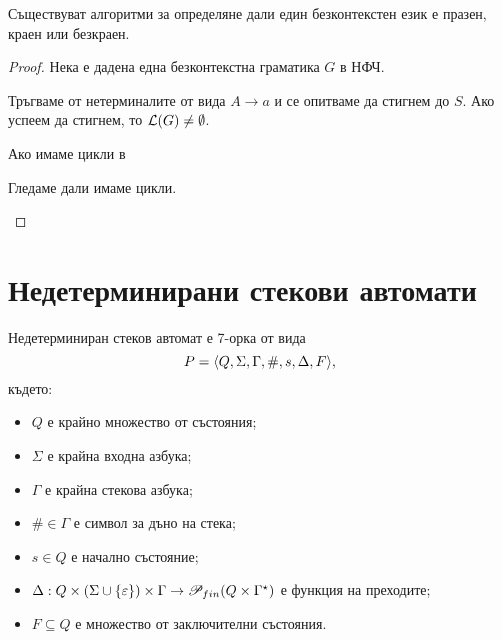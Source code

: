 \begin{thm}
  Съществуват алгоритми за определяне дали един безконтекстен език е 
  празен, краен или безкраен.
\end{thm}
\begin{proof}
  Нека е дадена една безконтекстна граматика $G$ в НФЧ.
  \begin{description}
  \item[($\L(G) = \emptyset?$)]
    Тръгваме от нетерминалите от вида $A\to a$ и се опитваме да стигнем до $S$.
    Ако успеем да стигнем, то $\mathcal{L}(G) \neq \emptyset$.
  \item
    Ако имаме цикли в 
  \item[($\abs{\L(G)} < \infty?$ или $\abs{\L(G)} = \infty?$)]
    Гледаме дали имаме цикли.
  \end{description}
\end{proof}

\section{Недетерминирани стекови автомати}

\begin{dfn}
  Недетерминиран стеков автомат е 7-орка от вида
  \[P = \langle{Q,\Sigma,\Gamma,\#,s,\Delta,F}\rangle,\] където:
  \begin{itemize}
  \item
    $Q$ е крайно множество от състояния;
  \item  
    $\Sigma$ е крайна входна азбука;
  \item
    $\Gamma$ е крайна стекова азбука;
  \item
    $\# \in \Gamma$ е символ за дъно на стека;
  \item
    $s\in Q$ е начално състояние;
  \item
    $\Delta:Q\times(\Sigma \cup \{\varepsilon\})\times\Gamma\rightarrow \mathscr{P}_{fin}(Q\times\Gamma^\star)$ 
    е функция на преходите;    
  \item
    $F\subseteq Q$ е множество от заключителни състояния.
  \end{itemize}
\end{dfn}

